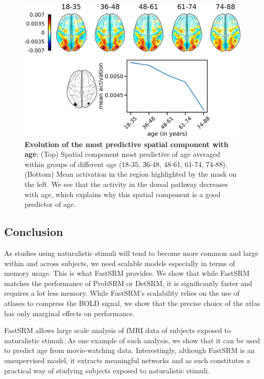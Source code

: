 \documentclass{report}
\begin{document}
{\begin{figure}
\centering
\includegraphics[scale=0.35]{figures/srm/feature_importance_age_prediction.png}
\caption{\textbf{Evolution of the most predictive spatial component with age}: (Top) Spatial component most predictive of age averaged within groups of different age (18-35, 36-48, 48-61, 61-74, 74-88). (Bottom) Mean activation in the region highlighted by the mask on the left. We see that the activity in the dorsal pathway decreases with age, which explains why this spatial component is a good predictor of age.}
\label{fig:predict_age_interpretation}
\end{figure}



\subsection{Conclusion}
As studies using naturalistic stimuli will tend to become more common and large within and across subjects, we need scalable models especially in terms of memory usage.
%
This is what FastSRM provides.
%
We show that while FastSRM matches the performance of ProbSRM or DetSRM, it is
significantly faster and requires a lot less memory. While FastSRM's scalability relies on the use of atlases to compress the BOLD signal, we show that the precise choice of the atlas has only marginal effects on performance.


FastSRM allows large scale analysis of fMRI data of subjects exposed to naturalistic stimuli. As one example of such analysis, we show that it can be used to predict age from movie-watching data. Interestingly, although FastSRM is an unsupervised model, it extracts meaningful networks and as such constitutes a practical way of studying subjects exposed to naturalistic stimuli.

}
\end{document}
